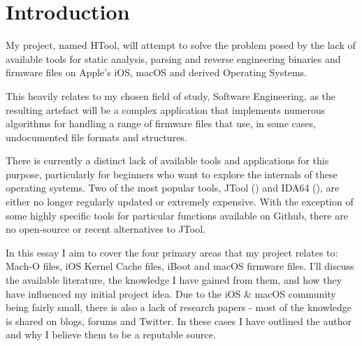 \section{Introduction}


My project, named HTool, will attempt to solve the problem posed by the lack of available tools for static analysis, parsing and reverse engineering binaries and firmware files on Apple's iOS, macOS and derived Operating Systems.

This heavily relates to my chosen field of study, Software Engineering, as the resulting artefact will be a complex application that implements numerous algorithms for handling a range of firmware files that use, in some cases, undocumented file formats and structures.

There is currently a distinct lack of available tools and applications for this purpose, particularly for beginners who want to explore the internals of these operating systems. Two of the most popular tools, JTool (\cite{levin-jtool}) and IDA64 (\cite{hexrays-ida64-pro}), are either no longer regularly updated or extremely expensive. With the exception of some highly specific tools for particular functions available on Github, there are no open-source or recent alternatives to JTool. 

In this essay I aim to cover the four primary areas that my project relates to: Mach-O files, iOS Kernel Cache files, iBoot and macOS firmware files. I'll discuss the available literature, the knowledge I have gained from them, and how they have influenced my initial project idea. Due to the iOS \& macOS community being fairly small, there is also a lack of research papers - most of the knowledge is shared on blogs, forums and Twitter. In these cases I have outlined the author and why I believe them to be a reputable source. 
